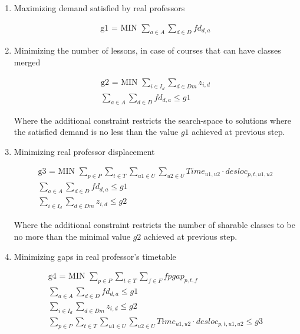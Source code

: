 \begin{enumerate}

\item{Maximizing demand satisfied by real professors}

\begin{align*}
   \mbox{g1 = MIN  } \sum\limits_{a \in A}\sum\limits_{d \in D} fd_{d,a}
\end{align*}

\item{Minimizing the number of lessons, in case of courses that can have classes merged}

\begin{align*}
  \mbox{g2 = MIN  } \sum\limits_{i \in I_{d}} \sum\limits_{d \in Dm} z_{i,d}
	\\
	\sum\limits_{a \in A}\sum\limits_{d \in D} fd_{d,a} \le g1
\end{align*}

Where the additional constraint restricts the search-space to solutions where the satisfied demand is no less than the value $g1$ achieved at previous step.

\item{Minimizing real professor displacement}

\begin{align*}
  \mbox{g3 = MIN  } \sum\limits_{p \in P} \sum\limits_{t \in T} \sum\limits_{u1 \in U} \sum\limits_{u2 \in U} Time_{u1,u2} \cdot desloc_{p,t,u1,u2}
	\\
	\sum\limits_{a \in A}\sum\limits_{d \in D} fd_{d,a} \le g1
	\\
	\sum\limits_{i \in I_{d}} \sum\limits_{d \in Dm} z_{i,d} \le g2
\end{align*}

Where the additional constraint restricts the number of sharable classes to be no more than the minimal value $g2$ achieved at previous step.

\item{Minimizing gaps in real professor's timetable}

\begin{align*}
   \mbox{g4 = MIN  } \sum\limits_{p \in P} \sum\limits_{t \in T} \sum\limits_{f \in F} fpgap_{p,t,f}
	\\
	\sum\limits_{a \in A}\sum\limits_{d \in D} fd_{d,a} \le g1
	\\
	\sum\limits_{i \in I_{d}} \sum\limits_{d \in Dm} z_{i,d} \le g2
	\\
	\sum\limits_{p \in P} \sum\limits_{t \in T} \sum\limits_{u1 \in U} \sum\limits_{u2 \in U} Time_{u1,u2} \cdot desloc_{p,t,u1,u2} \le g3
\end{align*}


\end{enumerate}
